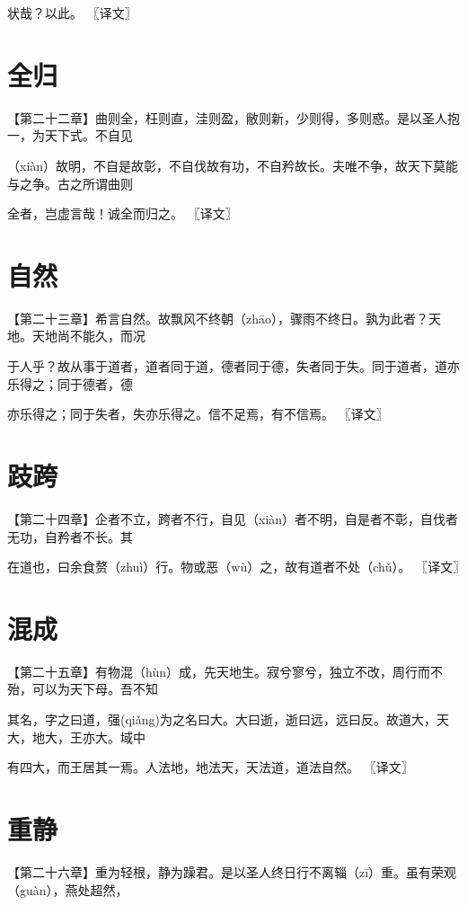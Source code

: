 \documentclass[a4paper,12pt,UTF8,twoside]{ctexbook}
\begin{document}
	状哉？以此。 〖译文〗
	
	
	
	
	
	\chapter{全归}
	【第二十二章】曲则全，枉则直，洼则盈，敝则新，少则得，多则惑。是以圣人抱一，为天下式。不自见
	
	（xiàn）故明，不自是故彰，不自伐故有功，不自矜故长。夫唯不争，故天下莫能与之争。古之所谓曲则
	
	全者，岂虚言哉！诚全而归之。 〖译文〗
	
	
	
	\chapter{自然}
	
	【第二十三章】希言自然。故飘风不终朝（zhāo），骤雨不终日。孰为此者？天地。天地尚不能久，而况
	
	于人乎？故从事于道者，道者同于道，德者同于德，失者同于失。同于道者，道亦乐得之；同于德者，德
	
	亦乐得之；同于失者，失亦乐得之。信不足焉，有不信焉。 〖译文〗
	
	
	
	\chapter{跂跨}
	
	【第二十四章】企者不立，跨者不行，自见（xiàn）者不明，自是者不彰，自伐者无功，自矜者不长。其
	
	在道也，曰余食赘（zhuì）行。物或恶（wù）之，故有道者不处（chǔ）。 〖译文〗
	
	
	
	\chapter{混成}
	
	【第二十五章】有物混（hùn）成，先天地生。寂兮寥兮，独立不改，周行而不殆，可以为天下母。吾不知
	
	其名，字之曰道，强(qiǎng)为之名曰大。大曰逝，逝曰远，远曰反。故道大，天大，地大，王亦大。域中
	
	有四大，而王居其一焉。人法地，地法天，天法道，道法自然。 〖译文〗
	
	
	

	\chapter{重静}
		【第二十六章】重为轻根，静为躁君。是以圣人终日行不离辎（zī）重。虽有荣观（guàn），燕处超然，
	
\end{document}
